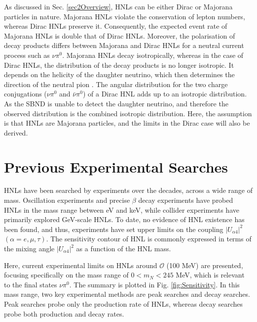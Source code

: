 As discussed in Sec. \ref{sec2Overview}, HNLs can be either Dirac or Majorana particles in nature.
Majorana HNLs violate the conservation of lepton numbers, whereas Dirac HNLs preserve it.
Consequently, the expected event rate of Majorana HNLs is double that of Dirac HNLs.
Moreover, the polarisation of decay products differs between Majorana and Dirac HNLs for a neutral current process such as $\nu\pi^{0}$.
Majorana HNLs decay isotropically, whereas in the case of Dirac HNLs, the distribution of the decay products is no longer isotropic.
It depends on the helicity of the daughter neutrino, which then determines the direction of the neutral pion \cite{HNLSilvia}.
The angular distribution for the two charge conjugations ($\nu\pi^{0}$ and $\bar{\nu}\pi^{0}$) of a Dirac HNL adds up to an isotropic distribution.
As the SBND is unable to detect the daughter neutrino, and therefore the observed distribution is the combined isotropic distribution. 
Here, the assumption is that HNLs are Majorana particles, and the limits in the Dirac case will also be derived.

\section{Previous Experimental Searches}
\label{sec2Previous}


HNLs have been searched by experiments over the decades, across a wide range of mass.
Oscillation experiments and precise $\beta$ decay experiments have probed HNLs in the mass range between eV and keV, while collider experiments have primarily explored GeV-scale HNLs.
To date, no evidence of HNL existence has been found, and thus, experiments have set upper limits on the coupling $|U_{\alpha4}|^{2}$ $(\alpha=e,\mu,\tau)$.
The sensitivity contour of HNL is commonly expressed in terms of the mixing angle $|U_{\alpha4}|^{2}$ as a function of the HNL mass.

Here, current experimental limits on HNLs around $\mathcal{O}$ (100 MeV) are presented, focusing specifically on the mass range of $ 0 < m_{N} < 245 $ MeV, which is relevant to the final states $\nu\pi^{0}$.
The summary is plotted in Fig. \ref{fig:Sensitivity}.
In this mass range, two key experimental methods are peak searches and decay searches.
Peak searches probe only the production rate of HNLs, whereas decay searches probe both production and decay rates.


